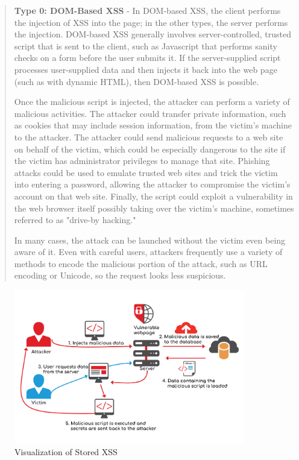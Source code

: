 \begin{quote}
	\textbf{Type 0: DOM-Based XSS} - In DOM-based XSS, the client performs the injection of XSS into the page; in the other types, the server performs the injection. DOM-based XSS generally involves server-controlled, trusted script that is sent to the client, such as Javascript that performs sanity checks on a form before the user submits it. If the server-supplied script processes user-supplied data and then injects it back into the web page (such as with dynamic HTML), then DOM-based XSS is possible.

	Once the malicious script is injected, the attacker can perform a variety of malicious activities. The attacker could transfer private information, such as cookies that may include session information, from the victim's machine to the attacker. The attacker could send malicious requests to a web site on behalf of the victim, which could be especially dangerous to the site if the victim has administrator privileges to manage that site. Phishing attacks could be used to emulate trusted web sites and trick the victim into entering a password, allowing the attacker to compromise the victim's account on that web site. Finally, the script could exploit a vulnerability in the web browser itself possibly taking over the victim's machine, sometimes referred to as "drive-by hacking."

	In many cases, the attack can be launched without the victim even being aware of it. Even with careful users, attackers frequently use a variety of methods to encode the malicious portion of the attack, such as URL encoding or Unicode, so the request looks less suspicious. \cite{mitre/XSS}
\end{quote}

\begin{figure}
	\centering
	\includegraphics[width=0.9\textwidth]{storedxss.png}
	\caption{Visualization of Stored XSS \cite{acunetix/storedxss}}
	\label{fig:storedxss}
\end{figure}

